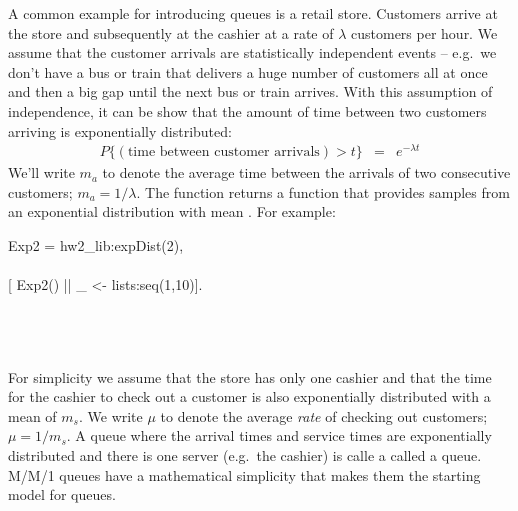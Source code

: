 \documentclass{article}
\begin{document}
\begin{enumerate}
          A common example for introducing queues is a retail store.  Customers arrive at the
          store and subsequently at the cashier at a rate of $\lambda$ customers per hour.
          We assume that the customer arrivals are statistically independent events --
          e.g.\ we don't have a bus or train that delivers a huge number of customers all
          at once and then a big gap until the next bus or train arrives.  With this
          assumption of independence, it can be show that the amount of time between
          two customers arriving is exponentially distributed:
          \begin{displaymath}\begin{array}{rcl}
                  P\{(\textrm{time between customer arrivals}) > t\} & = & e^{-\lambda t}
              \end{array}\end{displaymath}
          We'll write $m_a$ to denote the average time between the arrivals
          of two consecutive customers; $m_a = 1/\lambda$.
          The function 
          returns a function that provides samples from an exponential distribution
          with mean .
          For example:
          \begin{SmallCode}
              \eprompt{} Exp2 = hw2\_lib:expDist(2),\\
              \\
              \eprompt{} [ Exp2() || \_ <- lists:seq(1,10)].\\
              \xout{[0.1713282082900304,1.6155340550767132,1.334425942758621,} \\
              \\
              \\
              \xout{\phantom{x}5.386802172521248]}
          \end{SmallCode}

          For simplicity we assume that the store has only one cashier and that the time
          for the cashier to check out a customer is also exponentially distributed with
          a mean of $m_s$.
          We write $\mu$ to denote the average \emph{rate} of checking out customers;
          $\mu = 1/m_s$.
          A queue where the arrival times and service times are exponentially distributed
          and there is one server (e.g.\ the cashier) is calle a
          called a  queue.
          M/M/1 queues have a mathematical simplicity that makes them the starting model
          for queues.


\end{enumerate}
\end{document}
